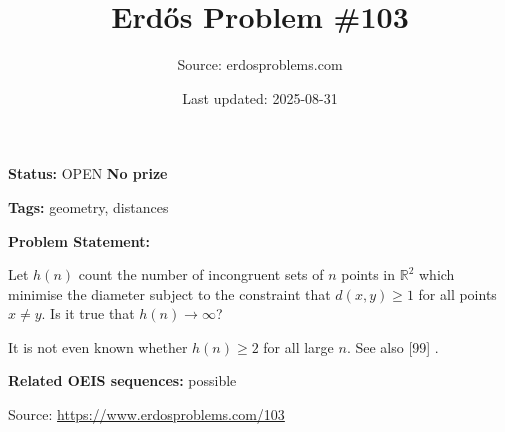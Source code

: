 \documentclass{article}
\title{Erd\H{o}s Problem \#103}
\date{Last updated: 2025-08-31}
\author{Source: erdosproblems.com}
\begin{document}
\maketitle

\noindent\textbf{Status:} OPEN \quad \textbf{No prize}

\noindent\textbf{Tags:} geometry, distances

\medskip

\noindent\textbf{Problem Statement:}

Let $h(n)$ count the number of incongruent sets of $n$ points in $\mathbb{R}^2$ which minimise the diameter subject to the constraint that $d(x,y)\geq 1$ for all points $x\neq y$. Is it true that $h(n)\to \infty$?




It is not even known whether $h(n)\geq 2$ for all large $n$. See also [99] .

\noindent\textbf{Related OEIS sequences:} possible


\bigskip
\noindent\small{Source: \url{https://www.erdosproblems.com/103}}
\end{document}
